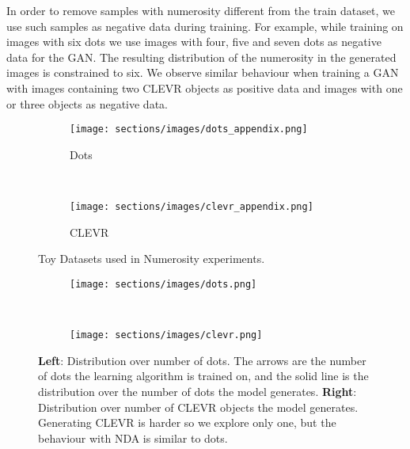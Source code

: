 \documentclass{article} \usepackage{iclr2021_conference,times}
\begin{document}
In order to remove samples with numerosity different from the train dataset, we use such samples as negative data during training. For example, while training on images with six dots we use images with four, five and seven dots as negative data for the GAN. The resulting distribution of the numerosity in the generated images is constrained to six. We observe similar behaviour when training a GAN with images containing two CLEVR objects as positive data and images with one or three objects as negative data.


\begin{figure*}[!h]
\centering
\begin{subfigure}[b]{0.5\textwidth}
    \texttt{[image: sections/images/dots\_appendix.png]}
    \caption{Dots}
    \label{fig:dots_data}
\end{subfigure}
\\
\begin{subfigure}[b]{0.5\textwidth}
    \texttt{[image: sections/images/clevr\_appendix.png]}
    \caption{CLEVR}
    \label{fig:clevr_data}
\end{subfigure}

\caption{Toy Datasets used in Numerosity experiments.}
\label{fig:toydataset}
\end{figure*}


\begin{figure*}[!h]
\centering
\begin{subfigure}[b]{0.4\textwidth}
    \texttt{[image: sections/images/dots.png]}
    \caption{}
    \label{fig:dots}
\end{subfigure}~
\begin{subfigure}[b]{0.4\textwidth}
    \texttt{[image: sections/images/clevr.png]}
    \caption{}
    \label{fig:clevr}
\end{subfigure}

\caption{\textbf{Left}: Distribution over number of dots. The arrows are the number of dots the learning algorithm is trained on, and the solid line is the distribution over the number of dots the model generates. \textbf{Right}: Distribution over number of CLEVR objects the model generates. Generating CLEVR is harder so we explore only one, but the behaviour with NDA is similar to dots.}
\label{fig:toyeexp}
\end{figure*}
\end{document}
